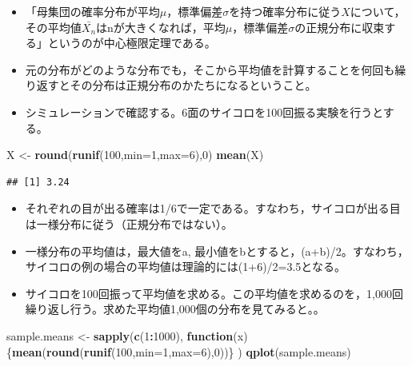 \documentclass[]{article}
\newenvironment{Shaded}{\begin{snugshade}}{\end{snugshade}}
\newcommand{\KeywordTok}[1]{\textcolor[rgb]{0.13,0.29,0.53}{\textbf{#1}}}
\newcommand{\DataTypeTok}[1]{\textcolor[rgb]{0.13,0.29,0.53}{#1}}
\newcommand{\DecValTok}[1]{\textcolor[rgb]{0.00,0.00,0.81}{#1}}
\newcommand{\StringTok}[1]{\textcolor[rgb]{0.31,0.60,0.02}{#1}}
\newcommand{\ControlFlowTok}[1]{\textcolor[rgb]{0.13,0.29,0.53}{\textbf{#1}}}
\newcommand{\OperatorTok}[1]{\textcolor[rgb]{0.81,0.36,0.00}{\textbf{#1}}}
\newcommand{\NormalTok}[1]{#1}
\providecommand{\tightlist}{%
  \setlength{\itemsep}{0pt}\setlength{\parskip}{0pt}}
\begin{document}
\begin{itemize}
\tightlist
\item
  「母集団の確率分布が平均\(\mu\)，標準偏差\(\sigma\)を持つ確率分布に従う\(X\)について，その平均値\(\bar{X_{n}}\)はnが大きくなれば，平均\(\mu\)，標準偏差\(\sigma\)の正規分布に収束する」というのが中心極限定理である。
\item
  元の分布がどのような分布でも，そこから平均値を計算することを何回も繰り返すとその分布は正規分布のかたちになるということ。\\
\item
  シミュレーションで確認する。6面のサイコロを100回振る実験を行うとする。
\end{itemize}

\begin{Shaded}
\begin{Highlighting}[]
\NormalTok{X <-}\StringTok{ }\KeywordTok{round}\NormalTok{(}\KeywordTok{runif}\NormalTok{(}\DecValTok{100}\NormalTok{,}\DataTypeTok{min=}\DecValTok{1}\NormalTok{,}\DataTypeTok{max=}\DecValTok{6}\NormalTok{),}\DecValTok{0}\NormalTok{)}
\KeywordTok{mean}\NormalTok{(X)}
\end{Highlighting}
\end{Shaded}

\begin{verbatim}
## [1] 3.24
\end{verbatim}

\begin{itemize}
\item
  それぞれの目が出る確率は1/6で一定である。すなわち，サイコロが出る目は一様分布に従う（正規分布ではない）。\\
\item
  一様分布の平均値は，最大値をa,
  最小値をbとすると，(a+b)/2。すなわち，サイコロの例の場合の平均値は理論的には(1+6)/2=3.5となる。
\item
  サイコロを100回振って平均値を求める。この平均値を求めるのを，1,000回繰り返し行う。求めた平均値1,000個の分布を見てみると。。
\end{itemize}

\begin{Shaded}
\begin{Highlighting}[]
\NormalTok{sample.means <-}\StringTok{ }\KeywordTok{sapply}\NormalTok{(}\KeywordTok{c}\NormalTok{(}\DecValTok{1}\OperatorTok{:}\DecValTok{1000}\NormalTok{), }\ControlFlowTok{function}\NormalTok{(x) \{}\KeywordTok{mean}\NormalTok{(}\KeywordTok{round}\NormalTok{(}\KeywordTok{runif}\NormalTok{(}\DecValTok{100}\NormalTok{,}\DataTypeTok{min=}\DecValTok{1}\NormalTok{,}\DataTypeTok{max=}\DecValTok{6}\NormalTok{),}\DecValTok{0}\NormalTok{))\} )}
\KeywordTok{qplot}\NormalTok{(sample.means)}
\end{Highlighting}
\end{Shaded}
\end{document}
